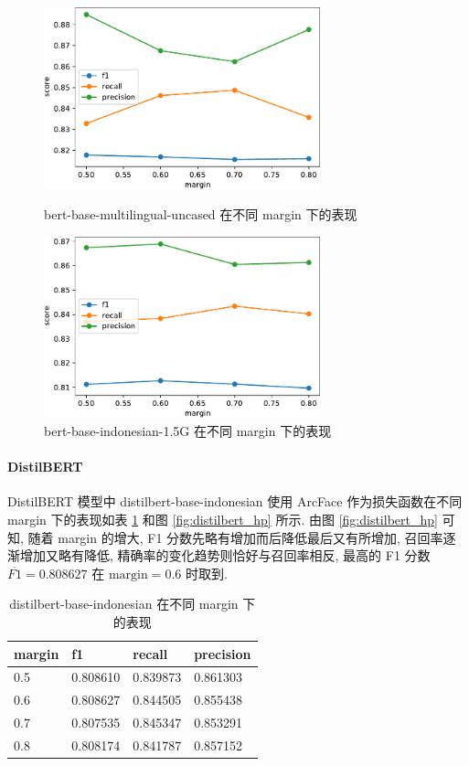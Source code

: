 \documentclass[12pt]{article}
\begin{document}
\begin{figure}[htbp]
  \centering
  \begin{minipage}[t]{0.48\textwidth}
    \centering
    \includegraphics[width=8cm]{bert_multi_hp.pdf}
    \caption{bert-base-multilingual-uncased 在不同 margin 下的表现}
    \label{fig:bert_multi_hp}
  \end{minipage}
  \begin{minipage}[t]{0.48\textwidth}
    \centering
    \includegraphics[width=8cm]{bert_indon_hp.pdf}
    \caption{bert-base-indonesian-1.5G 在不同 margin 下的表现}
    \label{fig:bert_indon_hp}
  \end{minipage}
\end{figure}

\paragraph{DistilBERT}

DistilBERT 模型中 distilbert-base-indonesian 使用 ArcFace 作为损失函数在不同 margin 下的表现如表 \ref{tab:distilbert_hp} 和图 \ref{fig:distilbert_hp} 所示. 由图 \ref{fig:distilbert_hp} 可知, 随着 margin 的增大, F1 分数先略有增加而后降低最后又有所增加, 召回率逐渐增加又略有降低, 精确率的变化趋势则恰好与召回率相反, 最高的 F1 分数 $\overline{F1}=0.808627$ 在 $\text{margin} = 0.6$ 时取到.

\begin{table}[htbp]
  \centering
  \caption{distilbert-base-indonesian 在不同 margin 下的表现}
  \label{tab:distilbert_hp}
  \begin{tabular}{llll}
    \toprule
    margin & f1       & recall   & precision \\
    \midrule
    0.5 & 0.808610 & 0.839873 & 0.861303  \\
    0.6 & 0.808627 & 0.844505 & 0.855438  \\
    0.7 & 0.807535 & 0.845347 & 0.853291  \\
    0.8 & 0.808174 & 0.841787 & 0.857152  \\
    \bottomrule
  \end{tabular}
\end{table}
\end{document}
